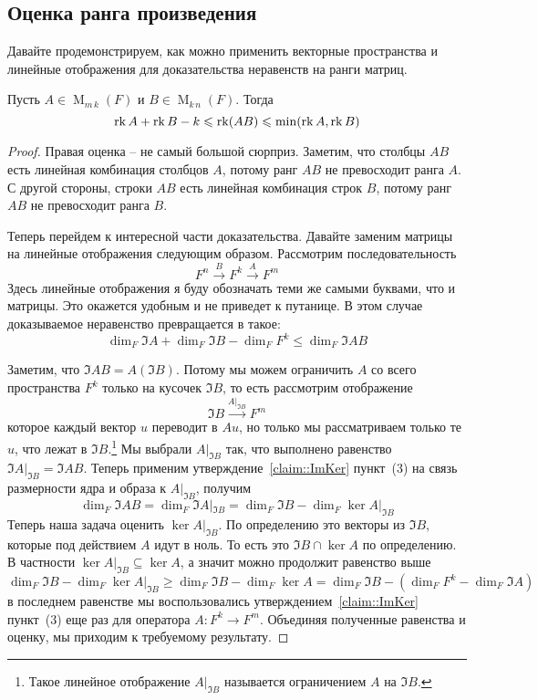 \subsection{Оценка ранга произведения}

Давайте продемонстрируем, как можно применить векторные пространства и линейные отображения для доказательства неравенств на ранги матриц.

\begin{claim}
Пусть $A\in \operatorname{M}_{m\,k}(F)$ и $B\in\operatorname{M}_{k\,n}(F)$. Тогда
\[
\operatorname{rk} A +\operatorname{rk} B - k \leqslant \operatorname{rk} (AB )\leqslant \min(\operatorname{rk} A, \operatorname{rk} B)
\]
\end{claim}
\begin{proof}
Правая оценка -- не самый большой сюрприз. Заметим, что столбцы $AB$ есть линейная комбинация столбцов $A$, потому ранг $AB$ не превосходит ранга $A$. С другой стороны, строки $AB$ есть линейная комбинация строк $B$, потому ранг $AB$ не превосходит ранга $B$.

Теперь перейдем к интересной части доказательства. Давайте заменим матрицы на линейные отображения следующим образом. Рассмотрим последовательность 
\[
F^n \stackrel{B}{\longrightarrow} F^k \stackrel{A}{\longrightarrow} F^m
\]
Здесь линейные отображения я буду обозначать теми же самыми буквами, что и матрицы. Это окажется удобным и не приведет к путанице. В этом случае доказываемое неравенство превращается в такое:
\[
\dim_F \Im A + \dim_F \Im B - \dim_F F^k \leqslant \dim_F\Im AB
\]

Заметим, что $\Im AB = A(\Im B)$. Потому мы можем ограничить $A$ со всего пространства $F^k$ только на кусочек $\Im B$, то есть рассмотрим отображение
\[
\Im B \stackrel{A|_{\Im B}}{\longrightarrow} F^m
\]
которое каждый вектор $u$ переводит в $Au$, но только мы рассматриваем только те $u$, что лежат в $\Im B$.\footnote{Такое линейное отображение $A|_{\Im B}$ называется ограничением $A$ на $\Im B$.} Мы выбрали $A|_{\Im B}$ так, что выполнено равенство $\Im A|_{\Im B} = \Im AB$. Теперь применим утверждение~\ref{claim::ImKer} пункт~(3) на связь размерности ядра и образа к $A|_{\Im B}$, получим
\[
\dim_F \Im AB = \dim_F \Im A|_{\Im B} = \dim_F \Im B - \dim_F \ker A|_{\Im B}
\]
Теперь наша задача оценить $\ker A|_{\Im B}$. По определению это векторы из $\Im B$, которые под действием $A$ идут в ноль. То есть это $\Im B \cap \ker A$ по определению. В частности $\ker A|_{\Im B}\subseteq \ker A$, а значит можно продолжит равенство выше
\[
\dim_F \Im B - \dim_F \ker A|_{\Im B}\geqslant \dim_F \Im B - \dim_F \ker A = \dim_F \Im B - (\dim_F F^k - \dim_F \Im A)
\]
в последнем равенстве мы воспользовались утверждением~\ref{claim::ImKer} пункт~(3) еще раз для оператора $A\colon F^k \to F^m$.  Объединяя полученные равенства и оценку, мы приходим к требуемому результату.
\end{proof}

